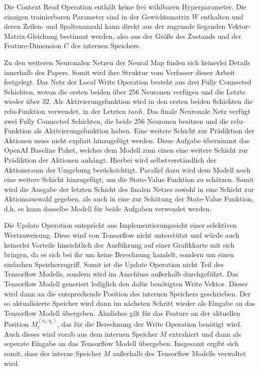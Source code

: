 Die Context Read Operation enthält keine frei wählbaren Hyperparameter. Die einzigen trainierbaren Parameter sind in der Gewichtsmatrix $W$ enthalten und deren Zeilen- und Spaltenanzahl kann direkt aus der zugrunde liegenden Vektor-Matrix-Gleichung bestimmt werden, also aus der Größe des Zustands und der Feature-Dimension $C$ des internen Speichers.

Zu den weiteren Neuronalen Netzen der Neural Map finden sich keinerlei Details innerhalb des Papers. Somit wird ihre Struktur vom Verfasser dieser Arbeit festgelegt. Das Netz der Local Write Operation besteht aus drei Fully Connected Schichten, wovon die ersten beiden über 256 Neuronen verfügen und die Letzte wieder über 32. Als Aktivierungsfunktion wird in den ersten beiden Schichten die relu-Funktion verwendet, in der Letzten $tanh$. Das finale Neuronale Netz verfügt zwei Fully Connected Schichten, die beide 256 Neuronen besitzen und die relu-Funktion als Aktivierungsfunktion haben. Eine weitere Schicht zur Prädiktion der Aktionen muss nicht explizit hinzugefügt werden. Diese Aufgabe übernimmt das OpenAI Baseline Paket, welches dem Modell zum einen eine weitere Schicht zur Prädiktion der Aktionen anhängt. Hierbei wird selbstverständlich der Aktionsraum der Umgebung berücksichtigt. Parallel dazu wird dem Modell noch eine weitere Schicht hinzugefügt, um die State-Value Funktion zu schätzen. Somit wird die Ausgabe der letzten Schicht des finalen Netzes sowohl in eine Schicht zur Aktionsauswahl gegeben, als auch in eine zur Schätung der State-Value Funktion, d.h. es kann dasselbe Modell für beide Aufgaben verwendet werden.

Die Update Operation entspricht aus Implementierungssicht einer selektiven Wertzuweisung. Diese wird von Tensorflow nicht unterstützt und würde auch keinerlei Vorteile hinsichtlich der Ausführung auf einer Grafikkarte mit sich bringen, da es sich bei ihr um keine Berechnung handelt, sondern um einen einfachen Speicherzugriff. Somit ist die Update Operation nicht Teil des Tensorflow Modells, sondern wird im Anschluss außerhalb durchgeführt. Das Tensorflow Modell generiert lediglich den dafür benötigten Write Vektor. Dieser wird dann an die entsprechende Position des internen Speichers geschrieben. Der so aktualisierte Speicher wird dann im nächsten Schritt wieder als Eingabe an das Tensorflow Modell übergeben. Ähnliches gilt für das Feature an der aktuellen Position $M_t^{(x_t,y_t)}$, das für die Berechnung der Write Operation benötigt wird. Auch dieses wird vorab aus dem internen Speicher $M$ extrahiert und dann als seperate Eingabe an das Tensorflow Modell übergeben. Insgesamt ergibt sich somit, dass der interne Speicher $M$ außerhalb des Tensorflow Modells verwaltet wird.


